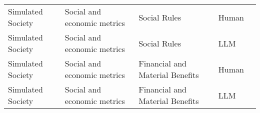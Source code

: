 \begin{small}
\begin{center}
\begin{longtable}{@{}p{}p{}p{}p{}p{}@{}}
Simulated Society        & Social and economic metrics         & Social Rules                                                                                                                                                                                                & Human     & \cite{zhou2024sotopiainteractiveevaluationsocial}                                                                                                                                                                                                                                                                                                                                                                                              \\
Simulated Society        & Social and economic metrics         & Social Rules                                                                                                                                                                                                & LLM       & \cite{zhou2024sotopiainteractiveevaluationsocial}                                                                                                                                                                                                                                                                                                                                                                                              \\
Simulated Society        & Social and economic metrics         & Financial and Material Benefits                                                                                                                                                                             & Human     & \cite{zhou2024sotopiainteractiveevaluationsocial}                                                                                                                                                                                                                                                                                                                                                                                              \\
Simulated Society        & Social and economic metrics         & Financial and Material Benefits                                                                                                                                                                             & LLM       & \cite{zhou2024sotopiainteractiveevaluationsocial}                                                                                                                                                                                                                                                                                                                                                                                              \\

\end{longtable}
\end{center}
\end{small}
